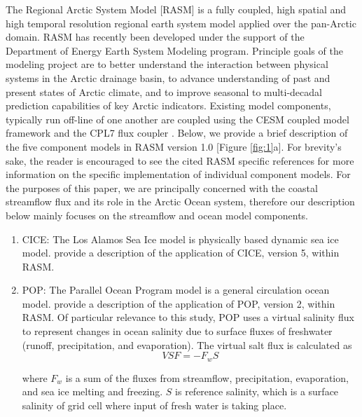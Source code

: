 \documentclass[jgrga, draft]{agutex}
\begin{document}
\begin{article}
The Regional Arctic System Model [RASM] is a fully coupled, high spatial and high temporal resolution regional earth system model applied over the pan-Arctic domain.
RASM has recently been developed under the support of the Department of Energy Earth System Modeling program.
Principle goals of the modeling project are to better understand the interaction between physical systems in the Arctic drainage basin, to advance understanding of past and present states of Arctic climate, and to improve seasonal to multi-decadal prediction capabilities of key Arctic indicators.
Existing model components, typically run off-line of one another are coupled using the CESM coupled model framework and the CPL7 flux coupler \citep{Craig_2011}.
Below, we provide a brief description of the five component models in RASM version 1.0 [Figure \ref{fig:1}a].
For brevity's sake, the reader is encouraged to see the cited RASM specific references for more information on the specific implementation of individual component models.
For the purposes of this paper, we are principally concerned with the coastal streamflow flux and its role in the Arctic Ocean system, therefore our description below mainly focuses on the streamflow and ocean model components.

\begin{enumerate}
\item CICE: The Los Alamos Sea Ice model \citep{Hunke_2010} is physically based dynamic sea ice model.
\citet{Roberts_2015a} provide a description of the application of CICE, version 5, within RASM.
\item POP: The Parallel Ocean Program model \citep{Smith_2010} is a general circulation ocean model.
\citet{Roberts_2015a} provide a description of the application of POP, version 2, within RASM.
Of particular relevance to this study, POP uses a virtual salinity flux to represent changes in ocean salinity due to surface fluxes of freshwater (runoff, precipitation, and evaporation).
The virtual salt flux is calculated as
\begin{equation}
     VSF= -F_w S
\end{equation}

where $F_w$ is a sum of the fluxes from streamflow, precipitation, evaporation, and sea ice melting and freezing. $S$ is reference salinity, which is a surface salinity of grid cell where input of fresh water is taking place.


\end{enumerate}
\end{article}
\end{document}
